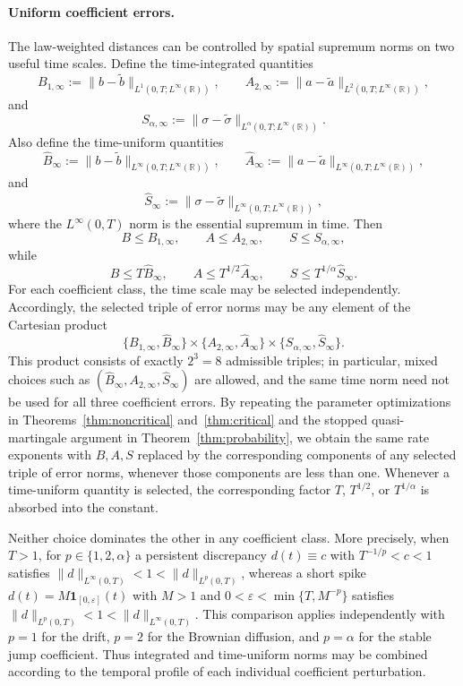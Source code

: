 \documentclass[11pt]{article}
\newcommand{\R}{\mathbb{R}}
\newcommand{\1}{\mathbf{1}}
\newcommand{\wt}{\tilde}
\begin{document}
\paragraph{Uniform coefficient errors.}
The law-weighted distances can be controlled by spatial supremum norms on two useful time scales.
Define the time-integrated quantities
\[
B_{1,\infty}
:=\|b-\wt b\|_{L^1(0,T;L^\infty(\R))},
\qquad
A_{2,\infty}
:=\|a-\wt a\|_{L^2(0,T;L^\infty(\R))},
\]
and
\[
S_{\alpha,\infty}
:=\|\sigma-\wt\sigma\|_{L^\alpha(0,T;L^\infty(\R))}.
\]
Also define the time-uniform quantities
\[
\hat B_\infty
:=\|b-\wt b\|_{L^\infty(0,T;L^\infty(\R))},
\qquad
\hat A_\infty
:=\|a-\wt a\|_{L^\infty(0,T;L^\infty(\R))},
\]
and
\[
\hat S_\infty
:=\|\sigma-\wt\sigma\|_{L^\infty(0,T;L^\infty(\R))},
\]
where the $L^\infty(0,T)$ norm is the essential supremum in time.
Then
\[
B\le B_{1,\infty},\qquad
A\le A_{2,\infty},\qquad
S\le S_{\alpha,\infty},
\]
while
\[
B\le T\hat B_\infty,\qquad
A\le T^{1/2}\hat A_\infty,\qquad
S\le T^{1/\alpha}\hat S_\infty.
\]
For each coefficient class, the time scale may be selected independently.
Accordingly, the selected triple of error norms may be any element of the Cartesian product
\[
\{B_{1,\infty},\hat B_\infty\}
\times
\{A_{2,\infty},\hat A_\infty\}
\times
\{S_{\alpha,\infty},\hat S_\infty\}.
\]
This product consists of exactly $2^3=8$ admissible triples; in particular, mixed choices such as $(\hat B_\infty,A_{2,\infty},\hat S_\infty)$ are allowed, and the same time norm need not be used for all three coefficient errors.
By repeating the parameter optimizations in Theorems~\ref{thm:noncritical} and~\ref{thm:critical} and the stopped quasi-martingale argument in Theorem~\ref{thm:probability}, we obtain the same rate exponents with $B,A,S$ replaced by the corresponding components of any selected triple of error norms, whenever those components are less than one.
Whenever a time-uniform quantity is selected, the corresponding factor $T$, $T^{1/2}$, or $T^{1/\alpha}$ is absorbed into the constant.

Neither choice dominates the other in any coefficient class.
More precisely, when $T>1$, for $p\in\{1,2,\alpha\}$ a persistent discrepancy $d(t)\equiv c$ with $T^{-1/p}<c<1$ satisfies $\|d\|_{L^\infty(0,T)}<1<\|d\|_{L^p(0,T)}$, whereas a short spike $d(t)=M\1_{[0,\varepsilon]}(t)$ with $M>1$ and $0<\varepsilon<\min\{T,M^{-p}\}$ satisfies $\|d\|_{L^p(0,T)}<1<\|d\|_{L^\infty(0,T)}$.
This comparison applies independently with $p=1$ for the drift, $p=2$ for the Brownian diffusion, and $p=\alpha$ for the stable jump coefficient.
Thus integrated and time-uniform norms may be combined according to the temporal profile of each individual coefficient perturbation.
\end{document}
